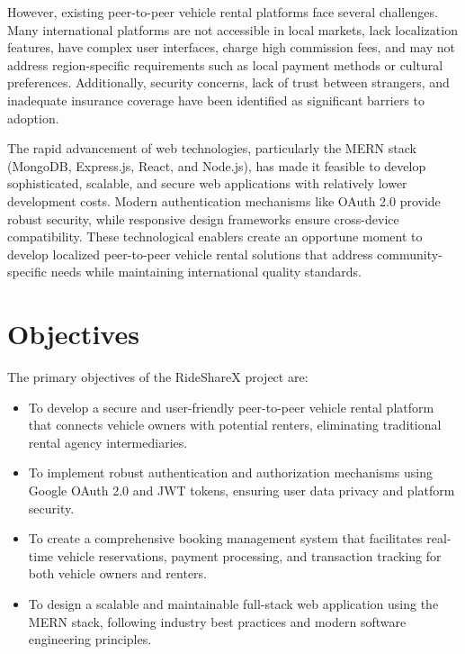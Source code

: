 \documentclass[12pt,a4paper]{report}
\begin{document}
	However, existing peer-to-peer vehicle rental platforms face several challenges. Many international platforms are not accessible in local markets, lack localization features, have complex user interfaces, charge high commission fees, and may not address region-specific requirements such as local payment methods or cultural preferences. Additionally, security concerns, lack of trust between strangers, and inadequate insurance coverage have been identified as significant barriers to adoption.
	
	The rapid advancement of web technologies, particularly the MERN stack (MongoDB, Express.js, React, and Node.js), has made it feasible to develop sophisticated, scalable, and secure web applications with relatively lower development costs. Modern authentication mechanisms like OAuth 2.0 provide robust security, while responsive design frameworks ensure cross-device compatibility. These technological enablers create an opportune moment to develop localized peer-to-peer vehicle rental solutions that address community-specific needs while maintaining international quality standards.
	
	\section{Objectives}
	The primary objectives of the RideShareX project are:
	
	\begin{itemize}
		\item To develop a secure and user-friendly peer-to-peer vehicle rental platform that connects vehicle owners with potential renters, eliminating traditional rental agency intermediaries.
		
		\item To implement robust authentication and authorization mechanisms using Google OAuth 2.0 and JWT tokens, ensuring user data privacy and platform security.
		
		\item To create a comprehensive booking management system that facilitates real-time vehicle reservations, payment processing, and transaction tracking for both vehicle owners and renters.
		
		\item To design a scalable and maintainable full-stack web application using the MERN stack, following industry best practices and modern software engineering principles.
	\end{itemize}
	
\end{document}
